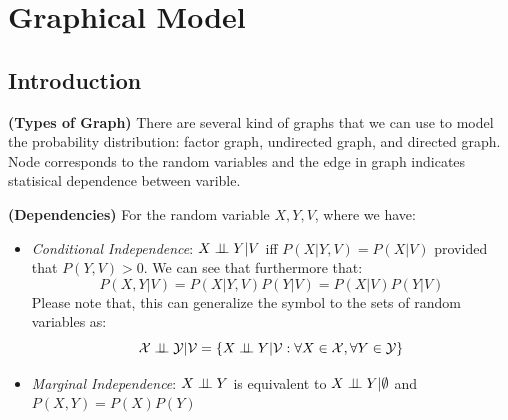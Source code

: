 \section{Graphical Model}

\subsection{Introduction}

\begin{definition}{\textbf{(Types of Graph)}}
    There are several kind of graphs that we can use to model the probability distribution: factor graph, undirected graph, and directed graph. Node corresponds to the random variables and the edge in graph indicates statisical dependence between varible.
\end{definition}

\begin{definition}{\textbf{(Dependencies)}}
    For the random variable $X,Y,V$, where we have:
    \begin{itemize}
        \item \emph{Conditional Independence}: $X\perp \!\!\! \perp Y | V$ iff $P(X | Y, V) = P(X|V)$ provided that $P(Y, V)>0$. We can see that furthermore that:
        \begin{equation*}
            P(X, Y | V) = P(X | Y, V) P(Y| V) = P(X|V)P(Y|V)
        \end{equation*}
        Please note that, this can generalize the symbol to the sets of random variables as:
        \begin{equation*}
            \mathcal{X}\perp \!\!\! \perp\mathcal{Y} | \mathcal{V} = \left\{ X\perp \!\!\! \perp Y | \mathcal{V} : \forall X \in \mathcal{X}, \forall Y \in \mathcal{Y} \right\}
        \end{equation*}
        \item \emph{Marginal Independence}: $X\perp \!\!\! \perp Y$ is equivalent to $X\perp \!\!\! \perp Y | \emptyset$ and $P(X, Y) = P(X)P(Y)$
    \end{itemize} 
\end{definition}

